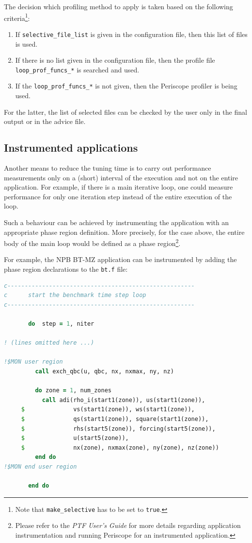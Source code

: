 \documentclass[11pt,a4paper, oneside]{book} %
\begin{document}
The decision which profiling method to apply is taken based on the following criteria\footnote{Note that \texttt{make\_selective} has to be set to \texttt{true}.}:

\begin{enumerate}
	\item If \texttt{selective\_file\_list} is given in the configuration file, then this list of files is used.
	\item If there is no list given in the configuration file, then the profile file \texttt{loop\_prof\_funcs\_*} is searched and used.
	\item If the \texttt{loop\_prof\_funcs\_*} is not given, then the Periscope profiler is being used.
\end{enumerate}

For the latter, the list of selected files can be checked by the user only in the final output or in the advice file.



\subsection{Instrumented applications}

Another means to reduce the tuning time is to carry out performance measurements only on a (short) interval of the execution and not on the entire application. For example, if there is a main iterative loop, one could measure performance for only one iteration step instead of the entire execution of the loop.

Such a behaviour can be achieved by instrumenting the application with an appropriate phase region definition. More precisely, for the case above, the entire body of the main loop would be defined as a phase region\footnote{Please refer to the \textit{PTF User's Guide} for more details regarding application instrumentation and running Periscope for an instrumented application.}.

For example, the NPB BT-MZ application can be instrumented by adding the phase region declarations to the \texttt{bt.f} file:

\begin{lstlisting}[language=Fortran]
c------------------------------------------------------
c      start the benchmark time step loop
c------------------------------------------------------

       do  step = 1, niter

! (lines omitted here ...)

!$MON user region
         call exch_qbc(u, qbc, nx, nxmax, ny, nz)

         do zone = 1, num_zones
           call adi(rho_i(start1(zone)), us(start1(zone)),
     $              vs(start1(zone)), ws(start1(zone)),
     $              qs(start1(zone)), square(start1(zone)),
     $              rhs(start5(zone)), forcing(start5(zone)),
     $              u(start5(zone)),
     $              nx(zone), nxmax(zone), ny(zone), nz(zone))
         end do
!$MON end user region

       end do
\end{lstlisting}
\end{document}

